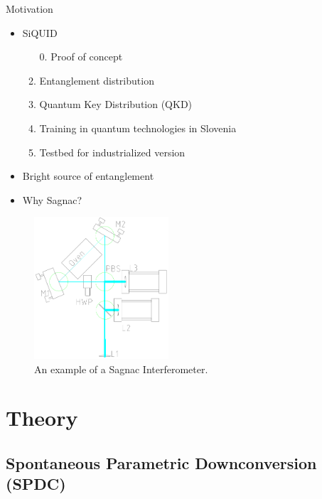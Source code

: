 \documentclass[serif,8pt]{beamer}
\begin{document}
\begin{frame}{Motivation}
	\begin{minipage}[l]{0.48\textwidth}
		\begin{itemize}
			\item SiQUID 
				\begin{enumerate}
					\item[0.] Proof of concept
					\item Entanglement distribution
					\item Quantum Key Distribution (QKD)
					\item Training in quantum technologies in Slovenia
					\item Testbed for industrialized version
				\end{enumerate}
			\item Bright source of entanglement
			\item Why Sagnac?
		\end{itemize}
	\end{minipage}
	\begin{minipage}[r]{0.48\textwidth}
		\begin{figure}
			\begin{center}
				\includegraphics[width=5cm]{SagnacCAD.png}
			\end{center}
			\caption{An example of a Sagnac Interferometer.}
		\end{figure}
	\end{minipage}
\end{frame}

\section{Theory}
\subsection{Spontaneous Parametric Downconversion (SPDC)}
\end{document}

